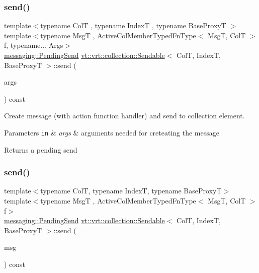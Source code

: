 \mbox{\label{structvt_1_1vrt_1_1collection_1_1_sendable_a65e5494a18b398b52f12c056cff1dc16}} 
\subsubsection{\texorpdfstring{send()}{send()}\hspace{0.1cm}{\footnotesize\ttfamily [3/6]}}
{\footnotesize\ttfamily template$<$typename ColT , typename IndexT , typename Base\+ProxyT $>$ \\
template$<$typename MsgT , Active\+Col\+Member\+Typed\+Fn\+Type$<$ Msg\+T, Col\+T $>$ f, typename... Args$>$ \\
\hyperlink{structvt_1_1messaging_1_1_pending_send}{messaging\+::\+Pending\+Send} \hyperlink{structvt_1_1vrt_1_1collection_1_1_sendable}{vt\+::vrt\+::collection\+::\+Sendable}$<$ ColT, IndexT, Base\+ProxyT $>$\+::send (\begin{DoxyParamCaption}\item[{Args \&\&...}]{args }\end{DoxyParamCaption}) const}



Create message (with action function handler) and send to collection element. 


\begin{DoxyParams}[1]{Parameters}
\mbox{\tt in}  & {\em args} & arguments needed for creteating the message\\
\hline
\end{DoxyParams}
\begin{DoxyReturn}{Returns}
a pending send 
\end{DoxyReturn}
\mbox{\label{structvt_1_1vrt_1_1collection_1_1_sendable_a321d85ceafaf6525875fb7468a80ac6d}} 
\subsubsection{\texorpdfstring{send()}{send()}\hspace{0.1cm}{\footnotesize\ttfamily [4/6]}}
{\footnotesize\ttfamily template$<$typename ColT, typename IndexT, typename Base\+ProxyT$>$ \\
template$<$typename MsgT , Active\+Col\+Member\+Typed\+Fn\+Type$<$ Msg\+T, Col\+T $>$ f$>$ \\
\hyperlink{structvt_1_1messaging_1_1_pending_send}{messaging\+::\+Pending\+Send} \hyperlink{structvt_1_1vrt_1_1collection_1_1_sendable}{vt\+::vrt\+::collection\+::\+Sendable}$<$ ColT, IndexT, Base\+ProxyT $>$\+::send (\begin{DoxyParamCaption}\item[{MsgT $\ast$}]{msg }\end{DoxyParamCaption}) const}

